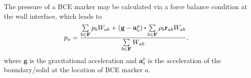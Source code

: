 

The pressure of a BCE marker may be calculated via a force balance condition at the wall interface, which leads to \cite{Adami2012}
\begin{equation} \label{eq:pBCE_Adami}
p_a = \frac{\sum\limits_{b \in \bf F} {p_b W_{ab}} + \left( \mathbf{g} - \mathbf{a}_a^p \right) \bigcdot \sum\limits_{b \in \bf F} {\rho_b \mathbf{r}_{ab} W_{ab} }}{\sum\limits_{b \in \bf F} {W_{ab}}},
\end{equation}
where $\mathbf{g}$ is the gravitational acceleration and $\mathbf{a}_a^p$ is the acceleration of the boundary/solid at the location of BCE marker $a$.

